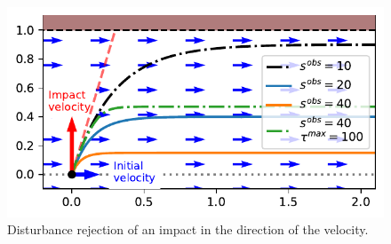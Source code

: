 \begin{figure}[htb]
\centering
  \centerline{\includegraphics[width=0.99\columnwidth]{figures/parallel_avoidance_obstacle}}
  \caption{Disturbance rejection of an impact in the direction of the velocity.}
  \label{fig:disturbance_with_parallel_velocity}
\end{figure}


